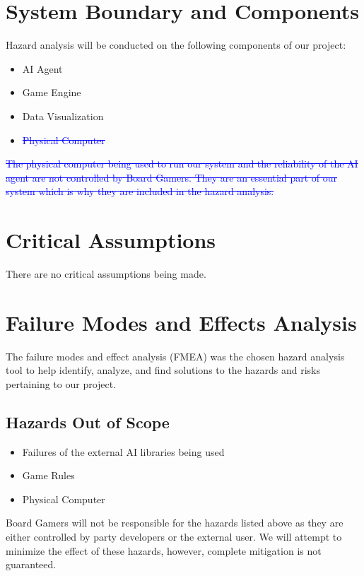 \documentclass{article}
\begin{document}
\section{System Boundary and Components}
Hazard analysis will be conducted on the following components of our project:
\begin{itemize}
    \item AI Agent
    \item Game Engine
    \item Data Visualization
    \item \textcolor{blue}{\sout{Physical Computer}}
\end{itemize}

\textcolor{blue}{\sout{The physical computer being used to run our system and the reliability of the AI agent are not controlled by Board Gamers. They are an essential part of our system which is why they are included in the hazard analysis.}}

\section{Critical Assumptions}
There are no critical assumptions being made.

\section{Failure Modes and Effects Analysis}
The failure modes and effect analysis (FMEA) was the chosen hazard analysis tool to help identify, analyze, and find solutions to the hazards and risks pertaining to our project.
\subsection{Hazards Out of Scope}
\begin{itemize}
    \item Failures of the external AI libraries being used
    \item Game Rules
    \item Physical Computer
\end{itemize}
Board Gamers will not be responsible for the hazards listed above as they are either controlled by  party developers or the external user. We will attempt to minimize the effect of these hazards, however, complete mitigation is not guaranteed.
\end{document}
